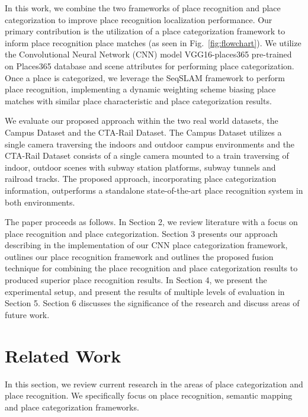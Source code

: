 \documentclass[letterpaper, 10 pt, conference]{ieeeconf}  %
\begin{document}
In this work, we combine the two frameworks of place recognition and place categorization to improve place recognition localization performance. Our primary contribution is the utilization of a place categorization framework to inform place recognition place matches (as seen in Fig.~\ref{fig:flowchart}).  We utilize the Convolutional Neural Network (CNN) model VGG16-places365 \cite{cnnPlaces365Github} pre-trained on Places365 database \cite{zhou2014learning} and scene attributes  \cite{Patterson2012SunAttributes} for performing place categorization. Once a place is categorized, we leverage the SeqSLAM framework to perform place recognition, implementing a dynamic weighting scheme biasing place matches with similar place characteristic and place categorization results. 

We evaluate our proposed approach within the two real world datasets, the Campus Dataset and the CTA-Rail Dataset. The Campus Dataset utilizes a single camera traversing the indoors and outdoor campus environments and the CTA-Rail Dataset consists of a single camera mounted to a train traversing of indoor, outdoor scenes with subway station platforms, subway tunnels and railroad tracks. The proposed approach, incorporating place categorization information,  outperforms a standalone state-of-the-art place recognition system in both environments.  

The paper proceeds as follows. In Section 2, we review literature with a focus on place recognition and place categorization. Section 3 presents our approach describing in the implementation of our CNN place categorization framework, outlines our place recognition framework and outlines the proposed fusion technique for combining the place recognition and place categorization results to produced superior place recognition results. In Section 4, we present the experimental setup, and present the results of multiple levels of evaluation in Section 5. Section 6 discusses the significance of the research and discuss areas of future work.

\section{Related Work}
In this section, we review current research in the areas of place categorization and place recognition. We specifically focus on place recognition, semantic mapping and place categorization frameworks. 
\end{document}
